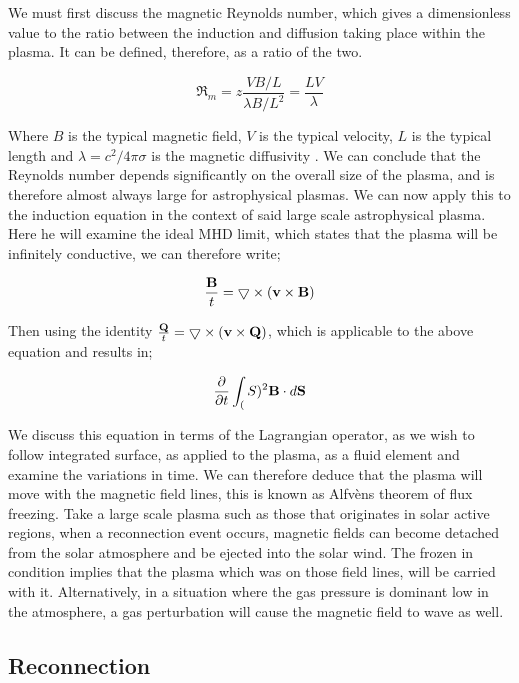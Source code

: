We must first discuss the magnetic Reynolds number, which gives a dimensionless value to the ratio between the induction and diffusion taking place within the plasma.
It can be defined, therefore, as a ratio of the two.

\begin{equation}
	\Re_m = z\frac{VB/L}{\lambda B/L^2} = \frac{LV}{\lambda} 
\end{equation}

Where $B$ is the typical magnetic field, $V$ is the typical velocity, $L$ is the typical length and $\lambda = c^2/{4\pi\sigma}$ is the magnetic diffusivity \citep{Choudhuri1998}.
We can conclude that the Reynolds number depends significantly on the overall size of the plasma, and is therefore almost always large for astrophysical plasmas.
We can now apply this to the induction equation in the context of said large scale astrophysical plasma.
Here he will examine the ideal MHD limit, which states that the plasma will be infinitely conductive, we can therefore write;

\begin{equation}
	\frac{\mathbf{B}}{t} = \bigtriangledown \times (\mathbf{v} \times \mathbf{B})
\end{equation}

Then using the identity $\frac{\mathbf{Q}}{t} = \bigtriangledown \times (\mathbf{v} \times \mathbf{Q})$, which is applicable to the above equation and results in;

\begin{equation}
	\frac{\partial }{\partial t } \int_(S)^{2} \mathbf{B} \cdot d\mathbf{S}
\end{equation}

We discuss this equation in terms of the Lagrangian operator, as we wish to follow integrated surface, as applied to the plasma, as a fluid element and examine the variations in time.
We can therefore deduce that the plasma will move with the magnetic field lines, this is known as Alfv{\`e}ns theorem of flux freezing.
Take a large scale plasma such as those that originates in solar active regions, when a reconnection event occurs, magnetic fields can become detached from the solar atmosphere and be ejected into the solar wind.
The frozen in condition implies that the plasma which was on those field lines, will be carried with it.
Alternatively, in a situation where the gas pressure is dominant low in the atmosphere, a gas perturbation will cause the magnetic field to wave as well.
 


\subsection{Reconnection}
\label{sec:recon}

